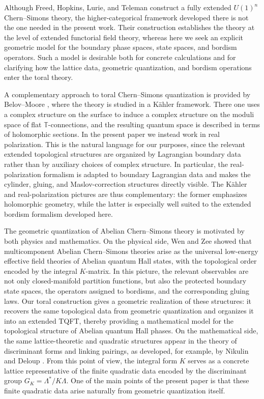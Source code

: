 \documentclass[12pt]{amsart}
\numberwithin{equation}{section}
\begin{document}
Although Freed, Hopkins, Lurie, and Teleman \cite{FreedHopkinsLurieTeleman} construct a fully extended \(U(1)^n\) Chern--Simons theory, the higher-categorical framework developed there is not the one needed in the present work. Their construction establishes the theory at the level of extended functorial field theory, whereas here we seek an explicit geometric model for the boundary phase spaces, state spaces, and bordism operators. Such a model is desirable both for concrete calculations and for clarifying how the lattice data, geometric quantization, and bordism operations enter the toral theory.

A complementary approach to toral Chern--Simons quantization is provided by Belov--Moore \cite{BelovMoore}, where the theory is studied in a K\"ahler framework. There one uses a complex structure on the surface to induce a complex structure on the moduli space of flat \(\mathbb T\)-connections, and the resulting quantum space is described in terms of holomorphic sections. In the present paper we instead work in real polarization. This is the natural language for our purposes, since the relevant extended topological structures are organized by Lagrangian boundary data rather than by auxiliary choices of complex structure. In particular, the real-polarization formalism is adapted to boundary Lagrangian data and makes the cylinder, gluing, and Maslov-correction structures directly visible. The Kähler and real-polarization pictures are thus complementary: the former emphasizes holomorphic geometry, while the latter is especially well suited to the extended bordism formalism developed here.

The geometric quantization of Abelian Chern--Simons theory is motivated by both physics and mathematics. On the physical side, Wen and Zee \cite{wenzee1992,Wen2016} showed that multicomponent Abelian Chern--Simons theories arise as the universal low-energy effective field theories of Abelian quantum Hall states, with the topological order encoded by the integral \(K\)-matrix. In this picture, the relevant observables are not only closed-manifold partition functions, but also the protected boundary state spaces, the operators assigned to bordisms, and the corresponding gluing laws. Our toral construction gives a geometric realization of these structures: it recovers the same topological data from geometric quantization and organizes it into an extended TQFT, thereby providing a mathematical model for the topological structure of Abelian quantum Hall phases. On the mathematical side, the same lattice-theoretic and quadratic structures appear in the theory of discriminant forms and linking pairings, as developed, for example, by Nikulin \cite{Nikulin1980} and Deloup \cite{Deloup1999}. From this point of view, the integral form \(K\) serves as a concrete lattice representative of the finite quadratic data encoded by the discriminant group \(G_K=\Lambda^*/K\Lambda\). One of the main points of the present paper is that these finite quadratic data arise naturally from geometric quantization itself.
\end{document}

